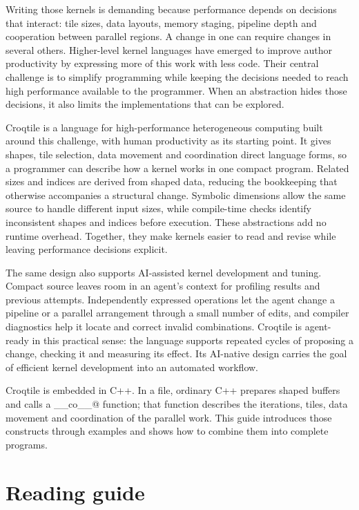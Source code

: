 Writing those kernels is demanding because performance depends on decisions
that interact: tile sizes, data layouts, memory staging, pipeline depth and
cooperation between parallel regions. A change in one can require changes
in several others. Higher-level kernel languages have emerged to improve
author productivity by expressing more of this work with less code. Their
central challenge is to simplify programming while keeping the decisions
needed to reach high performance available to the programmer. When an
abstraction hides those decisions, it also limits the implementations that
can be explored.

Croqtile is a language for high-performance heterogeneous computing built
around this challenge, with human productivity as its starting point.
It gives shapes, tile selection, data movement and coordination direct
language forms, so a programmer can describe how a kernel works in one
compact program. Related sizes and indices are derived from shaped data,
reducing the bookkeeping that otherwise accompanies a structural change.
Symbolic dimensions allow the same source to handle different input sizes,
while compile-time checks identify inconsistent shapes and indices before
execution. These abstractions add no runtime overhead. Together, they make
kernels easier to read and revise while leaving performance decisions
explicit.

The same design also supports AI-assisted kernel development and tuning.
Compact source leaves room in an agent's context for profiling results and
previous attempts. Independently expressed operations let the agent change
a pipeline or a parallel arrangement through a small number of edits, and
compiler diagnostics help it locate and correct invalid combinations.
Croqtile is agent-ready in this practical sense: the language supports
repeated cycles of proposing a change, checking it and measuring its effect.
Its AI-native design carries the goal of efficient kernel development into
an automated workflow.

Croqtile is embedded in C++. In a  file, ordinary C++ prepares
shaped buffers and calls a \co@__co__@ function; that function describes
the iterations, tiles, data movement and coordination of the parallel work.
This guide introduces those constructs through examples and shows how to
combine them into complete programs.

\section*{Reading guide}

